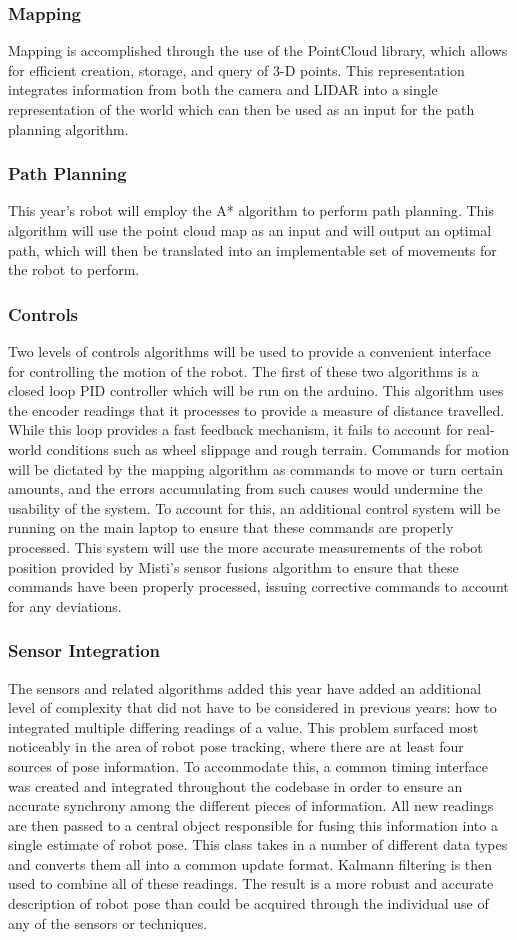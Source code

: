 \subsubsection{Mapping}
Mapping is accomplished through the use of the PointCloud library, which allows for efficient creation, storage, and query of 3-D points. This representation integrates information from both the camera and LIDAR into a single representation of the world which can then be used as an input for the path planning algorithm.
\subsubsection{Path Planning}
This year's robot will employ the A* algorithm to perform path planning. This algorithm will use the point cloud map as an input and will output an optimal path, which will then be translated into an implementable set of movements for the robot to perform.
\subsubsection{Controls}
Two levels of controls algorithms will be used to provide a convenient interface for controlling the motion of the robot. The first of these two algorithms is a closed loop PID controller which will be run on the arduino. This algorithm uses the encoder readings that it processes to provide a measure of distance travelled. While this loop provides a fast feedback mechanism, it fails to account for real-world conditions such as wheel slippage and rough terrain. Commands for motion will be dictated by the mapping algorithm as commands to move or turn certain amounts, and the errors accumulating from such causes would undermine the usability of the system. To account for this, an additional control system will be running on the main laptop to ensure that these commands are properly processed. This system will use the more accurate measurements of the robot position provided by Misti's sensor fusions algorithm to ensure that these commands have been properly processed, issuing corrective commands to account for any deviations.
\subsubsection{Sensor Integration}
The sensors and related algorithms added this year have added an additional level of complexity that did not have to be considered in previous years: how to integrated multiple differing readings of a value. This problem surfaced most noticeably in the area of robot pose tracking, where there are at least four sources of pose information. To accommodate this, a common timing interface was created and integrated throughout the codebase in order to ensure an accurate synchrony among the different pieces of information. All new readings are then passed to a central object responsible for fusing this information into a single estimate of robot pose. This class takes in a number of different data types and converts them all into a common update format. Kalmann filtering is then used to combine all of these readings. The result is a more robust and accurate description of robot pose than could be acquired through the individual use of any of the sensors or techniques.
